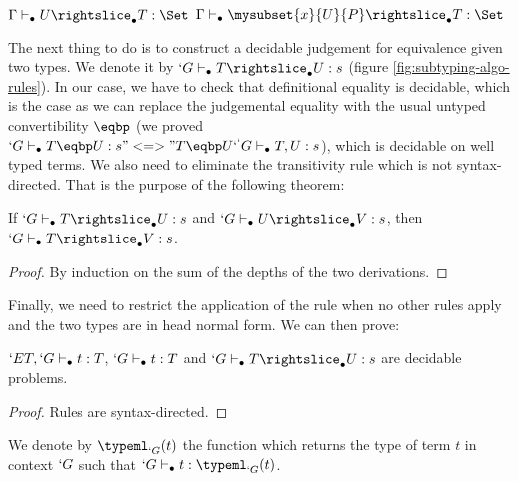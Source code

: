 \documentclass{llncs}
\renewcommand{\SubSubAs}[1][\Gamma]{%
\UAX{SubSub}
{$\subalgoimpl{#1}{c}{U}{T}{\Set}$}
{$\subalgoimpl{#1}{c[\eltpit~\ctxdot]}{\mysubset{x}{U}{P}}{T}{\Set}$}
{}
}
\begin{document}
\begin{paragraph}{}

\begin{figure*}
    \def\fCenter{\suba}
    \def\type{\typea}
    \def\sub{\suba}
    \begin{center}
    \SubConvA\DP 

    \vspace{\infvspace}
    \SubHnfA\DP

    \vspace{\infvspace}
    \SubProdA\DP

    \vspace{\infvspace}
    \SubSigmaA\DP

    \vspace{\infvspace}
    \SubProofA\DP

    \vspace{\infvspace}
    \SubSubAs\DP
  \end{center}
  \vspace{-1em}
  \caption{\Russell{} algorithmic equivalence}
  \label{fig:subtyping-algo-rules}
  \vspace{-1em}
\end{figure*}


\end{paragraph}
\begin{paragraph}{}
  The next thing to do is to construct a decidable judgement for
  equivalence given two types. We denote it by $`G \typea T
  \suba U : s$ (figure \ref{fig:subtyping-algo-rules}).
  In our case, we have to check that definitional equality is decidable, which is the
  case as we can replace the judgemental equality with the usual untyped
  convertibility $\eqbp$ (we proved $`G \type T \eqbp U : s
  "<=>" T \eqbp U `^ `G \type T, U : s$), which is decidable on well
  typed terms.
  We also need to eliminate the transitivity rule which is not
  syntax-directed. That is the purpose of the following theorem:
\begin{theorem}
  If $`G \typea T \suba U : s$ and $`G \typea U \suba V : s$, then $`G \typea T
  \suba V : s$.
\end{theorem}
\begin{proof}
  By induction on the sum of the depths of the two derivations.
\end{proof}

  Finally, we need to restrict the application of the 
  rule when no other rules apply and the two types are in head normal form.
  We can then prove:
  \begin{theorem}
    $`E T, `G \vdash_{\bullet} t : T$, $`G \vdash_{\bullet} t : T$ and $`G \typea T \suba U :
    s$ are decidable problems.
  \end{theorem}
  \begin{proof}
    Rules are syntax-directed.
  \end{proof}

  We denote by $\typeafn{`G}{t}$ the function which returns the type of
  term $t$ in context $`G$ such that $`G \typea t : \typeafn{`G}{t}$.  
\end{paragraph}
\end{document}

